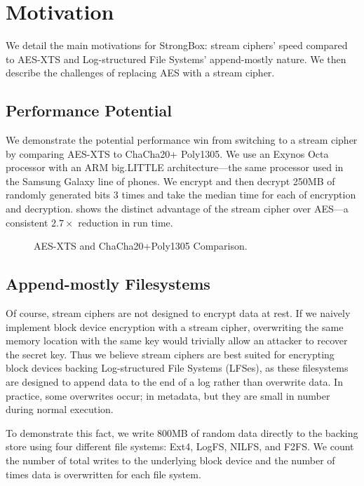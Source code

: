 \section{Motivation}\label{sec:motivation}

We detail the main motivations for StrongBox: stream ciphers' speed
compared to AES-XTS and Log-structured File Systems' append-mostly
nature. We then describe the challenges of replacing AES with a stream
cipher.

\subsection{Performance Potential}

We demonstrate the potential performance win from switching to a stream cipher
by comparing AES-XTS to ChaCha20+ Poly1305. We use an Exynos Octa processor with
an ARM big.LITTLE architecture---the same processor used in the Samsung Galaxy
line of phones. We encrypt and then decrypt 250MB of randomly generated bits 3
times and take the median time for each of encryption and decryption.
 shows the distinct advantage of the stream cipher over
AES---a consistent $2.7\times$ reduction in run time.

\begin{figure}[t]
  
\caption{AES-XTS and ChaCha20+Poly1305 Comparison.}\label{fig:motivation}
\end{figure}

\subsection{Append-mostly Filesystems}
Of course, stream ciphers are not designed to encrypt data at rest.
If we naively implement block device encryption with a stream cipher,
overwriting the same memory location with the same key would trivially
allow an attacker to recover the secret key. Thus we believe stream
ciphers are best suited for encrypting block devices backing
Log-structured File Systems (LFSes), as these filesystems are designed
to append data to the end of a log rather than overwrite data. In
practice, some overwrites occur; \eg in metadata, but they are small
in number during normal execution.

To demonstrate this fact, we write 800MB of random data directly to the backing
store using four different file systems: Ext4, LogFS, NILFS, and F2FS. We count
the number of total writes to the underlying block device and the number of
times data is overwritten for each file system.


